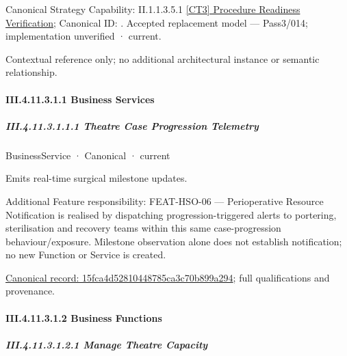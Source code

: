 {\small Canonical Strategy Capability: II.1.1.3.5.1 \hyperref[element:1ba44ca495b74b6fb3a607c39c6672e6]{[CT3] Procedure Readiness Verification}; Canonical ID: \texttt{}. Accepted replacement model — Pass3/014; implementation unverified · current.}\par
Contextual reference only; no additional architectural instance or semantic relationship.\par
\paragraph*{III.4.11.3.1.1 Business Services}
\label{navigation:III.4.11.3.1.1}

\subparagraph*{III.4.11.3.1.1.1 Theatre Case Progression Telemetry}
\label{navigation:III.4.11.3.1.1.1}

\label{element:15fca4d52810448785ca3c70b899a294}
{\small BusinessService · Canonical · current}\par

Emits real-time surgical milestone updates.



Additional Feature responsibility: FEAT-HSO-06 — Perioperative Resource Notification is realised by dispatching progression-triggered alerts to portering, sterilisation and recovery teams within this same case-progression behaviour/exposure. Milestone observation alone does not establish notification; no new Function or Service is created.


{\footnotesize \href{../../../../../../../continuum/business/business-service/15fca4d52810448785ca3c70b899a294.md}{Canonical record: 15fca4d52810448785ca3c70b899a294}; full qualifications and provenance.}\par
\paragraph*{III.4.11.3.1.2 Business Functions}
\label{navigation:III.4.11.3.1.2}

\subparagraph*{III.4.11.3.1.2.1 Manage Theatre Capacity}
\label{navigation:III.4.11.3.1.2.1}

